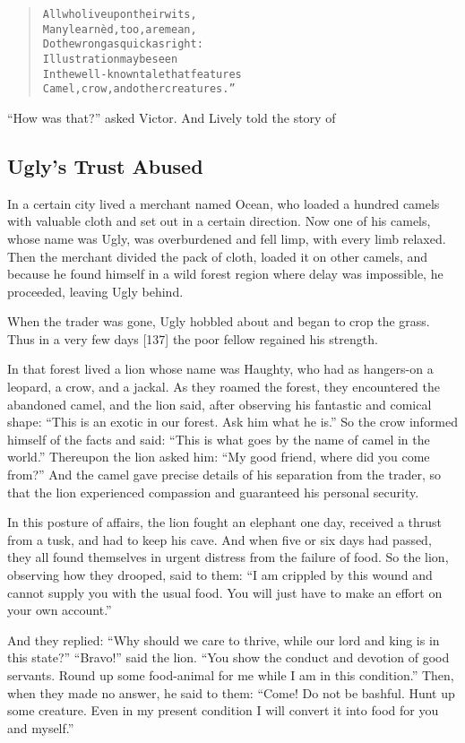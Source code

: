 \documentclass[article, twoside, 14pt]{memoir}
\renewenvironment{verbatim}{%
\begin{quote}%
\vskip -10pt%
\begin{alltt}\normalfont\large}{\end{alltt}%
\end{quote}%
\vskip -10pt
} %
\begin{document}
\begin{verbatim}
All who live upon their wits,
    Many learnèd, too, are mean,
Do the wrong as quick as right:
    Illustration may be seen
In the well-known tale that features
Camel, crow, and other creatures.”
\end{verbatim}
``How was that?'' asked Victor. And Lively told the story of

\subsection{Ugly's Trust Abused}

\label{s16}

In a certain city lived a merchant named Ocean, who loaded a
hundred camels with valuable cloth and set out in a certain
direction. Now one of his camels, whose name was Ugly, was
overburdened and fell limp, with every limb relaxed. Then the
merchant divided the pack of cloth, loaded it on other camels, and
because he found himself in a wild forest region where delay was
impossible, he proceeded, leaving Ugly behind.

When the trader was gone, Ugly hobbled about and began to crop the
grass. Thus in a very few days [137] the poor fellow regained his
strength.

In that forest lived a lion whose name was Haughty, who had as
hangers-on a leopard, a crow, and a jackal. As they roamed the
forest, they encountered the abandoned camel, and the lion said,
after observing his fantastic and comical shape:
``This is an exotic in our forest. Ask him what he is.'' So the
crow informed himself of the facts and said:
``This is what goes by the name of camel in the world.'' Thereupon
the lion asked him: ``My good friend, where did you come from?''
And the camel gave precise details of his separation from the
trader, so that the lion experienced compassion and guaranteed his
personal security.

In this posture of affairs, the lion fought an elephant one day,
received a thrust from a tusk, and had to keep his cave. And when
five or six days had passed, they all found themselves in urgent
distress from the failure of food. So the lion, observing how they
drooped, said to them:
``I am crippled by this wound and cannot supply you with the usual food. You will just have to make an effort on your own account.''

And they replied:
``Why should we care to thrive, while our lord and king is in this state?''
``Bravo!'' said the lion.
``You show the conduct and devotion of good servants. Round up some food-animal for me while I am in this condition.''
Then, when they made no answer, he said to them:
``Come! Do not be bashful. Hunt up some creature. Even in my present condition I will convert it into food for you and myself.''
\end{document}
